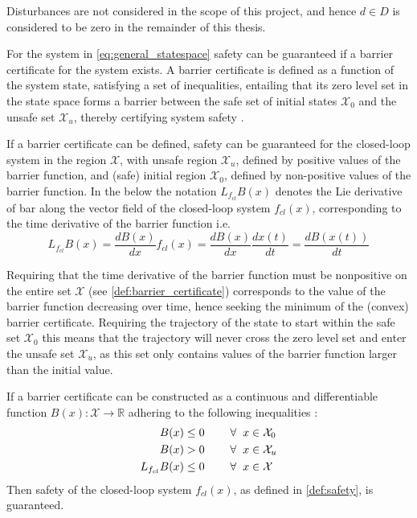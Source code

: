 Disturbances are not considered in the scope of this project, and hence $d\in D$ is considered to be zero in the remainder of this thesis.

For the system in \autoref{eq:general_statespace} safety can be guaranteed if a barrier certificate for the system exists. A barrier certificate is defined as a function of the system state, satisfying a set of inequalities, entailing that its zero level set in the state space forms a barrier between the safe set of initial states $\mathcal{X}_0$ and the unsafe set $\mathcal{X}_u$, thereby certifying system safety \citep{bib:prajna_framework}.


If a barrier certificate can be defined, safety can be guaranteed for the closed-loop system in the region $\mathcal{X}$, with unsafe region $\mathcal{X}_u$, defined by positive values of the barrier function, and (safe) initial region $\mathcal{X}_0$, defined by non-positive values of the barrier function. In the below the notation $L_{f_{cl}}B(x)$ denotes the Lie derivative of \gls{bar} along the vector field of the closed-loop system $f_{cl}(x)$, corresponding to the time derivative of the barrier function i.e.
\begin{equation}
L_{f_{cl}}B(x)=\frac{dB(x)}{dx}f_{cl}(x)=\frac{dB(x)}{dx}\frac{dx(t)}{dt}=\frac{dB(x(t))}{dt}
\end{equation}

Requiring that the time derivative of the barrier function must be nonpositive on the entire set $\mathcal{X}$ (see \autoref{def:barrier_certificate}) corresponds to the value of the barrier function decreasing over time, hence seeking the minimum of the (convex) barrier certificate. Requiring the trajectory of the state to start within the safe set $\mathcal{X}_0$ this means that the trajectory will never cross the zero level set and enter the unsafe set $\mathcal{X}_u$, as this set only contains values of the barrier function larger than the initial value.

\begin{exa}\label{def:barrier_certificate}	
If a barrier certificate can be constructed as a continuous and differentiable function $B(x):\mathcal{X} \rightarrow \mathbb{R}$ adhering to the following inequalities  \citep{bib:prajna_framework}:
\begin{subequations}\label{eq:barrier_constraints}
\begin{flalign}
B(x) &\leq 0 \hspace{0.8cm}  \forall \hspace{2mm} x \in \mathcal{X}_0  \label{cer1}\\
B(x) &> 0  \hspace{0.8cm}  \forall \hspace{2mm} x \in \mathcal{X}_u \label{cer2} \\
L_{f_{cl}}B(x) &\leq 0 \hspace{0.8cm}  \forall \hspace{2mm} x \in \mathcal{X} \label{cer3}
\end{flalign}
\end{subequations}
Then safety of the closed-loop system $f_{cl}(x)$, as defined in \autoref{def:safety}, is guaranteed. 
\end{exa}


